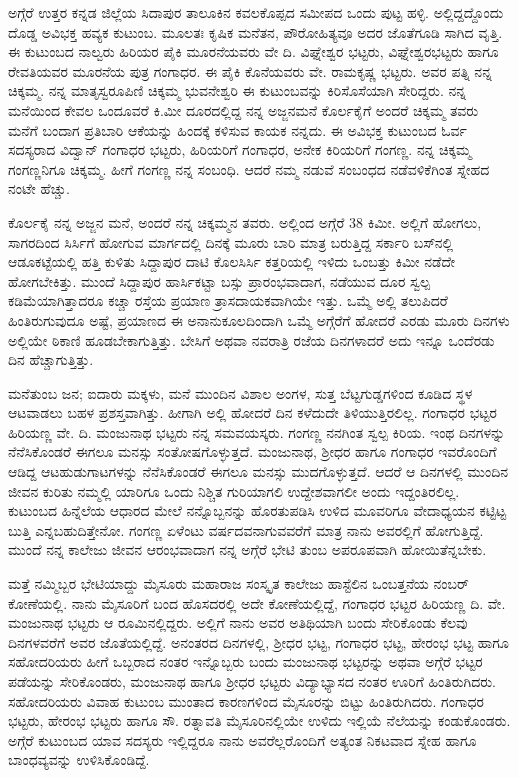 {ಅಗ್ಗೆರೆ ಉತ್ತರ ಕನ್ನಡ ಜಿಲ್ಲೆಯ ಸಿದಾಪುರ ತಾಲೂಕಿನ ಕವಲಕೊಪ್ಪದ ಸಮೀಪದ ಒಂದು ಪುಟ್ಟ ಹಳ್ಳಿ.  ಅಲ್ಲಿದ್ದದ್ದೊಂದು ದೊಡ್ಡ ಅವಿಭಕ್ತ ಹವ್ಯಕ ಕುಟುಂಬ.  ಮೂಲತಃ ಕೃಷಿಕ ಮನೆತನ, ಪೌರೋಹಿತ್ಯವೂ ಅದರ ಜೊತೆಗೂಡಿ ಸಾಗಿದ ವೃತ್ತಿ.  ಈ ಕುಟುಂಬದ ನಾಲ್ವರು ಹಿರಿಯರ ಪೈಕಿ ಮೂರನೆಯವರು ವೇ ದಿ. ವಿಘ್ನೇಶ್ವರ ಭಟ್ಟರು,  ವಿಘ್ನೇಶ್ವರಭಟ್ಟರು ಹಾಗೂ ರೇವತಿಯವರ ಮೂರನೆಯ ಪುತ್ರ ಗಂಗಾಧರ.  ಈ ಪೈಕಿ ಕೊನೆಯವರು ವೇ. ರಾಮಕೃಷ್ಣ ಭಟ್ಟರು.  ಅವರ ಪತ್ನಿ ನನ್ನ ಚಿಕ್ಕಮ್ಮ.  ನನ್ನ ಮಾತೃ\-ಸ್ವರೂಪಿಣಿ ಚಿಕ್ಕಮ್ಮ ಭುವನೇಶ್ವರಿ ಈ ಕುಟುಂಬವನ್ನು ಕಿರಿಸೊಸೆಯಾಗಿ ಸೇರಿದ್ದರು.  ನನ್ನ ಮನೆಯಿಂದ ಕೇವಲ ಒಂದೂವರೆ ಕಿ.ಮೀ ದೂರದಲ್ಲಿದ್ದ ನನ್ನ ಅಜ್ಜನಮನೆ ಕೊರ್ಲಕೈಗೆ ಅಂದರೆ ಚಿಕ್ಕಮ್ಮ ತವರು ಮನೆಗೆ ಬಂದಾಗ ಪ್ರತಿಬಾರಿ ಆಕೆಯನ್ನು ಹಿಂದಕ್ಕೆ ಕಳಿಸುವ ಕಾಯಕ ನನ್ನದು.  ಈ ಅವಿಭಕ್ತ ಕುಟುಂಬದ ಓರ್ವ ಸದಸ್ಯರಾದ ವಿದ್ವಾನ್ ಗಂಗಾಧರ ಭಟ್ಟರು, ಹಿರಿಯರಿಗೆ ಗಂಗಾಧರ, ಅನೇಕ ಕಿರಿಯರಿಗೆ ಗಂಗಣ್ಣ.  ನನ್ನ ಚಿಕ್ಕಮ್ಮ ಗಂಗಣ್ಣನಿಗೂ ಚಿಕ್ಕಮ್ಮ.  ಹೀಗೆ ಗಂಗಣ್ಣ ನನ್ನ ಸಂಬಂಧಿ.  ಆದರೆ ನಮ್ಮ ನಡುವೆ ಸಂಬಂಧದ ನಡೆವಳಿಕೆಗಿಂತ ಸ್ನೇಹದ ನಂಟೇ ಹೆಚ್ಚು. 

ಕೊರ್ಲಕೈ ನನ್ನ ಅಜ್ಜನ ಮನೆ, ಅಂದರೆ ನನ್ನ ಚಿಕ್ಕಮ್ಮನ ತವರು.  ಅಲ್ಲಿಂದ ಅಗ್ಗೆರೆ 38 ಕಿಮೀ.  ಅಲ್ಲಿಗೆ ಹೋಗಲು, ಸಾಗರದಿಂದ ಸಿರ್ಸಿಗೆ ಹೋಗುವ ಮಾರ್ಗದಲ್ಲಿ ದಿನಕ್ಕೆ ಮೂರು ಬಾರಿ ಮಾತ್ರ ಬರುತ್ತಿದ್ದ ಸರ್ಕಾರಿ ಬಸ್‍ನಲ್ಲಿ ಆಡೂಕಟ್ಟೆಯಲ್ಲಿ ಹತ್ತಿ ಕುಳಿತು ಸಿದ್ದಾಪುರ ದಾಟಿ ಕೊಲಸಿರ್ಸಿ ಕತ್ತರಿಯಲ್ಲಿ ಇಳಿದು ಒಂಬತ್ತು ಕಿಮೀ ನಡೆದೇ ಹೋಗ\-ಬೇಕಿತ್ತು.  ಮುಂದೆ ಸಿದ್ದಾಪುರ ಹಾರ್ಸಿಕಟ್ಟಾ ಬಸ್ಸು ಪ್ರಾರಂಭವಾದಾಗ, ನಡೆಯುವ ದೂರ ಸ್ವಲ್ಪ ಕಡಿಮೆಯಾಗಿತ್ತಾದರೂ ಕಚ್ಚಾ ರಸ್ತೆಯ ಪ್ರಯಾಣ ತ್ರಾಸದಾಯಕವಾಗಿಯೇ ಇತ್ತು.  ಒಮ್ಮೆ ಅಲ್ಲಿ ತಲುಪಿದರೆ ಹಿಂತಿರುಗುವುದೂ ಅಷ್ಟೆ, ಪ್ರಯಾಣದ ಈ ಅನಾನು\-ಕೂಲದಿಂದಾಗಿ ಒಮ್ಮೆ ಅಗ್ಗೆರೆಗೆ ಹೋದರೆ ಎರಡು ಮೂರು ದಿನಗಳು ಅಲ್ಲಿಯೇ ಠಿಕಾಣಿ ಹೂಡಬೇಕಾಗುತ್ತಿತ್ತು.  ಬೇಸಿಗೆ ಅಥವಾ ನವರಾತ್ರಿ ರಜೆಯ ದಿನಗಳಾದರೆ ಅದು ಇನ್ನೂ ಒಂದೆರಡು ದಿನ ಹೆಚ್ಚಾಗುತ್ತಿತ್ತು.  

ಮನೆತುಂಬ ಜನ; ಐದಾರು ಮಕ್ಕಳು, ಮನೆ ಮುಂದಿನ ವಿಶಾಲ ಅಂಗಳ, ಸುತ್ತ ಬೆಟ್ಟಗುಡ್ಡಗಳಿಂದ ಕೂಡಿದ ಸ್ಥಳ ಆಟವಾಡಲು ಬಹಳ ಪ್ರಶಸ್ತವಾಗಿತ್ತು.  ಹೀಗಾಗಿ ಅಲ್ಲಿ ಹೋದರೆ ದಿನ ಕಳೆದುದೇ ತಿಳಿಯುತ್ತಿರಲಿಲ್ಲ.  ಗಂಗಾಧರ ಭಟ್ಟರ ಹಿರಿಯಣ್ಣ ವೇ. ದಿ. ಮಂಜುನಾಥ ಭಟ್ಟರು ನನ್ನ ಸಮವಯಸ್ಕರು.  ಗಂಗಣ್ಣ ನನಗಿಂತ ಸ್ವಲ್ಪ ಕಿರಿಯ.  ಇಂಥ ದಿನಗಳನ್ನು ನೆನೆಸಿ\-ಕೊಂಡರೆ ಈಗಲೂ ಮನಸ್ಸು ಸಂತೋಷಗೊಳ್ಳುತ್ತದೆ.  ಮಂಜುನಾಥ, ಶ್ರೀಧರ ಹಾಗೂ ಗಂಗಾಧರ ಇವರೊಂದಿಗೆ ಆಡಿದ್ದ ಆಟ\enginline{-}ಹುಡುಗಾಟಗಳನ್ನು ನೆನೆಸಿ\-ಕೊಂಡರೆ ಈಗಲೂ ಮನಸ್ಸು ಮುದಗೊಳ್ಳುತ್ತದೆ.  ಆದರೆ ಆ ದಿನಗಳಲ್ಲಿ ಮುಂದಿನ ಜೀವನ ಕುರಿತು ನಮ್ಮಲ್ಲಿ ಯಾರಿಗೂ ಒಂದು ನಿಶ್ಚಿತ ಗುರಿಯಾಗಲಿ ಉದ್ದೇಶ\-ವಾಗಲೀ ಅಂದು ಇದ್ದಂತಿರಲಿಲ್ಲ.  ಕುಟುಂಬದ ಹಿನ್ನೆಲೆಯ ಆಧಾರದ ಮೇಲೆ ನನ್ನೊಬ್ಬನನ್ನು ಹೊರತುಪಡಿಸಿ ಉಳಿದ ಮೂವರಿಗೂ ವೇದಾಧ್ಯಯನ ಕಟ್ಟಿಟ್ಟ ಬುತ್ತಿ ಎನ್ನಬಹು\-ದಿತ್ತೇನೋ.  ಗಂಗಣ್ಣ ಏಳೆಂಟು ವರ್ಷದವನಾಗುವವರೆಗೆ ಮಾತ್ರ ನಾನು ಅವರಲ್ಲಿಗೆ ಹೋಗುತ್ತಿದ್ದೆ.  ಮುಂದೆ ನನ್ನ ಕಾಲೇಜು ಜೀವನ ಆರಂಭವಾದಾಗ ನನ್ನ ಅಗ್ಗೆರೆ ಭೇಟಿ ತುಂಬ ಅಪರೂಪವಾಗಿ ಹೋಯಿತೆನ್ನಬೇಕು. 

ಮತ್ತೆ ನಮ್ಮಿಬ್ಬರ ಭೇಟಿಯಾದ್ದು ಮೈಸೂರು ಮಹಾರಾಜ ಸಂಸ್ಕೃತ ಕಾಲೇಜು ಹಾಸ್ಟೆಲಿನ ಒಂಬತ್ತನೆಯ ನಂಬರ್ ಕೋಣೆಯಲ್ಲಿ.  ನಾನು ಮೈಸೂರಿಗೆ ಬಂದ ಹೊಸದರಲ್ಲಿ ಅದೇ ಕೋಣೆಯಲ್ಲಿದ್ದೆ, ಗಂಗಾಧರ ಭಟ್ಟರ ಹಿರಿಯಣ್ಣ ದಿ. ವೇ. ಮಂಜುನಾಥ ಭಟ್ಟರು ಆ ರೂಮಿನಲ್ಲಿದ್ದರು.  ಅಲ್ಲಿಗೆ ನಾನು ಅವರ ಅತಿಥಿಯಾಗಿ ಬಂದು ಸೇರಿಕೊಂಡು ಕೆಲವು ದಿನಗಳವರೆಗೆ ಅವರ ಜೊತೆಯಲ್ಲಿದ್ದೆ.  ಅನಂತರದ ದಿನಗಳಲ್ಲಿ, ಶ್ರೀಧರ ಭಟ್ಟ, ಗಂಗಾಧರ ಭಟ್ಟ, ಹೇರಂಭ ಭಟ್ಟ ಹಾಗೂ ಸಹೋದರಿಯರು ಹೀಗೆ ಒಬ್ಬರಾದ ನಂತರ ಇನ್ನೊಬ್ಬರು ಬಂದು ಮಂಜುನಾಥ ಭಟ್ಟರನ್ನು ಅಥವಾ ಅಗ್ಗೆರೆ ಭಟ್ಟರ ಪಡೆಯನ್ನು ಸೇರಿಕೊಂಡರು,  ಮಂಜುನಾಥ ಹಾಗೂ ಶ್ರೀಧರ ಭಟ್ಟರು ವಿದ್ಯಾಭ್ಯಾಸದ ನಂತರ ಊರಿಗೆ ಹಿಂತಿರುಗಿದರು.  ಸಹೋದರಿಯರು ವಿವಾಹ  \enginline{-}  ಕುಟುಂಬ ಮುಂತಾದ ಕಾರಣಗಳಿಂದ ಮೈಸೂರನ್ನು ಬಿಟ್ಟು ಹಿಂತಿರುಗಿದರು.  ಗಂಗಾಧರ ಭಟ್ಟರು, ಹೇರಂಭ ಭಟ್ಟರು ಹಾಗೂ ಸೌ. ರತ್ನಾವತಿ ಮೈಸೂರಿನಲ್ಲಿಯೇ ಉಳಿದು ಇಲ್ಲಿಯೆ ನೆಲೆಯನ್ನು ಕಂಡುಕೊಂಡರು.  ಅಗ್ಗೆರೆ ಕುಟುಂಬದ ಯಾವ ಸದಸ್ಯರು ಇಲ್ಲಿದ್ದರೂ ನಾನು ಅವರೆಲ್ಲರೊಂದಿಗೆ ಅತ್ಯಂತ ನಿಕಟವಾದ ಸ್ನೇಹ ಹಾಗೂ ಬಾಂಧವ್ಯವನ್ನು ಉಳಿಸಿಕೊಂಡಿದ್ದೆ.  

}
